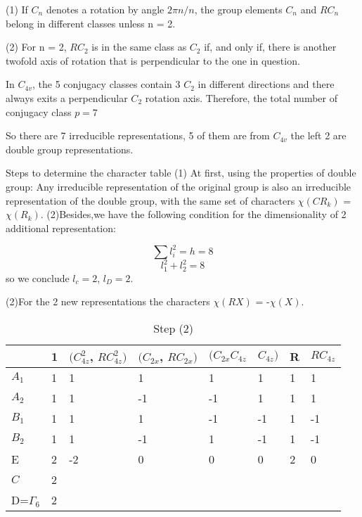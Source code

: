(1) If $C_n$ denotes a rotation by angle $2\pi n/n$, the group elements $C_n$ and $RC_n$ belong in different classes unless n = 2.

(2) For n = 2, $RC_2$ is in the same class as $C_2$ if, and only if, there is another twofold axis of rotation that is perpendicular to the one in question.

In $C_{4v}$, the 5 conjugacy classes contain 3 $C_2$ in different directions and there always exits a perpendicular $C_2$ rotation axis. Therefore, the total number of conjugacy class $p=7$

So there are 7 irreducible representations, 5 of them are from $C_{4v}$ the left 2 are double group representations. 

Steps to determine the character table
(1) At first, using the properties of double group: Any irreducible representation of the original group is also an irreducible representation of the double group, with the same set of characters $\chi(CR_k)$ = $\chi(R_k)$.
(2)Besides,we have
the following condition for the dimensionality of 2 additional representation:

$$\sum l_i^2=h=8$$
$$l_1^2+l_2^2=8$$
so we conclude $l_c=2$, $l_D=2$.

(2)For the 2 new representations the characters $\chi(RX)$ = -$\chi(X)$.

\begin{table}[h]
\begin{tabular}{l|lllllll}
             & 1 & $(C_{4z}^2$, $RC_{4z}^2)$ & $(C_{2x}$, $RC_{2x})$ & $(C_{2x}C_{4z}$ & $C_{4z})$ & R  & $RC_{4z}$ \\ \hline
$A_1$        & 1 & 1                       & 1                   & 1              & 1        & 1  & 1         \\
$A_2$        & 1 & 1                       & -1                  & -1             & 1        & 1  & 1         \\
$B_1$        & 1 & 1                       & 1                   & -1             & -1       & 1  & -1        \\
$B_2$        & 1 & 1                       & -1                  & 1              & -1       & 1  & -1        \\
E            & 2 & -2                      & 0                   & 0              & 0        & 2  & 0         \\
$C$          & 2 &                         &                     &                &          &    &           \\
D=$\Gamma_6$ & 2 &                         &                     &                &          &  &          
\end{tabular}
\caption{Step (2)}
\end{table}

